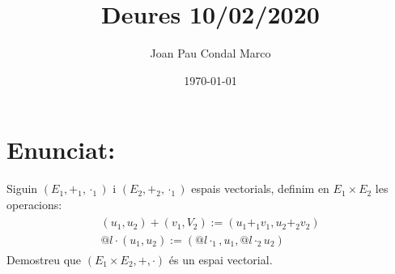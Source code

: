 \documentclass[a4paper, 9pt]{article}
\title{Deures 10/02/2020}
\author{Joan Pau Condal Marco}
\date{\today}
\begin{document}
    \maketitle
    \justify

    \section*{Enunciat:}
        Siguin ${(E_1, +_1, \cdot_1) \text{ i } (E_2, +_2, \cdot_1)}$ espais vectorials, definim en ${E_1 \times E_2}$ les operacions:
        \begin{align*}
            \begin{aligned}
                (u_1, u_2) + (v_1, V_2) := (u_1 +_1 v_1, u_2 +_2 v_2)\\
                @l\cdot (u_1, u_2) := (@l \cdot_1, u_1, @l \cdot_2 u_2)
            \end{aligned}
        \end{align*}
        Demostreu que ${(E_1 \times E_2, +, \cdot)}$ \'es un espai vectorial.
\end{document}
